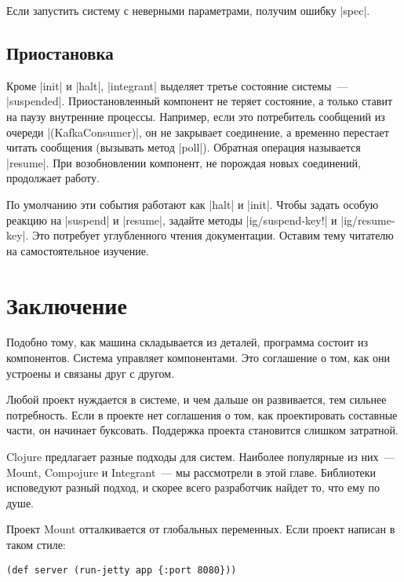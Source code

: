 Если запустить систему с неверными параметрами, получим ошибку \spverb|spec|.

\subsection{Приостановка}

Кроме \spverb|init| и \spverb|halt|, \spverb|integrant| выделяет третье
состояние системы~--- \spverb|suspended|. Приостановленный компонент не теряет
состояние, а только ставит на паузу внутренние процессы. Например, если это
потребитель сообщений из очереди \spverb|(KafkaConsumer)|, он не закрывает
соединение, а временно перестает читать сообщения (вызывать метод
\spverb|poll|). Обратная операция называется \spverb|resume|. При возобновлении
компонент, не порождая новых соединений, продолжает работу.

По умолчанию эти события работают как \spverb|halt| и \spverb|init|. Чтобы
задать особую реакцию на \spverb|suspend| и \spverb|resume|, задайте методы
\spverb|ig/suspend-key!| и \spverb|ig/resume-key|. Это потребует углубленного
чтения документации. Оставим тему читателю на самостоятельное изучение.


\section{Заключение}

Подобно тому, как машина складывается из деталей, программа состоит из
компонентов. Система управляет компонентами. Это соглашение о том, как они
устроены и связаны друг с другом.

Любой проект нуждается в системе, и чем дальше он развивается, тем сильнее
потребность. Если в проекте нет соглашения о том, как проектировать составные
части, он начинает буксовать. Поддержка проекта становится слишком затратной.

Clojure предлагает разные подходы для систем. Наиболее популярные из них~---
Mount, Compojure и Integrant~--- мы рассмотрели в этой главе. Библиотеки
исповедуют разный подход, и скорее всего разработчик найдет то, что ему по душе.

Проект Mount отталкивается от глобальных переменных. Если проект написан в таком
стиле:

\begin{verbatim}
(def server (run-jetty app {:port 8080}))
\end{verbatim}


